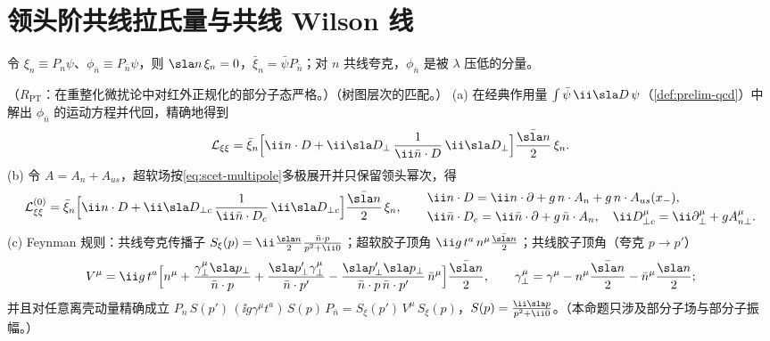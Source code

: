 \section{领头阶共线拉氏量与共线 Wilson 线}\label{sec:scet-lagrangian}

令 $\xi_n\equiv P_n\psi$、$\phi_{\bar n}\equiv P_{\bar n}\psi$，则 $\sla n\,\xi_n=0$，$\bar\xi_n=\bar\psi P_{\bar n}$；对 $n$ 共线夸克，$\phi_{\bar n}$ 是被 $\lambda$ 压低的分量。

\begin{proposition}\label{prop:scet-lagrangian}
（$R_{\mathrm{PT}}$：在重整化微扰论中对红外正规化的部分子态严格。）（树图层次的匹配。）
(a) 在经典作用量 $\int\bar\psi\,\ii\sla D\,\psi$（\cref{def:prelim-qcd}）中解出 $\phi_{\bar n}$ 的运动方程并代回，精确地得到
\begin{equation}\label{eq:scet-Lxixi-exact}
\mathcal L_{\xi\xi}=\bar\xi_n\Big[\ii n\cdot D+\ii\sla D_\perp\,\frac{1}{\ii\bar n\cdot D}\,\ii\sla D_\perp\Big]\frac{\bar{\sla n}}{2}\,\xi_n .
\end{equation}
(b) 令 $A=A_n+A_{us}$，超软场按\cref{eq:scet-multipole}多极展开并只保留领头幂次，得
\begin{equation}\label{eq:scet-L0xi}
\mathcal L^{(0)}_{\xi\xi}=\bar\xi_n\Big[\ii n\cdot D+\ii\sla D_{\perp c}\,\frac{1}{\ii\bar n\cdot D_c}\,\ii\sla D_{\perp c}\Big]\frac{\bar{\sla n}}{2}\,\xi_n,\qquad
\begin{aligned}
&\ii n\cdot D=\ii n\cdot\partial+g\,n\cdot A_n+g\,n\cdot A_{us}(x_-),\\
&\ii\bar n\cdot D_c=\ii\bar n\cdot\partial+g\,\bar n\cdot A_n,\quad \ii D^\mu_{\perp c}=\ii\partial^\mu_\perp+gA^\mu_{n\perp}.
\end{aligned}
\end{equation}
(c) Feynman 规则：共线夸克传播子 $S_\xi(p)=\ii\frac{\sla n}{2}\frac{\bar n\cdot p}{p^2+\ii0}$；超软胶子顶角 $\ii g\,t^a\,n^\mu\frac{\bar{\sla n}}{2}$；共线胶子顶角（夸克 $p\to p'$）
\begin{equation}\label{eq:scet-collvertex}
V^\mu=\ii g\,t^a\Big[n^\mu+\frac{\gamma_\perp^\mu\sla p_\perp}{\bar n\cdot p}+\frac{\sla p'_\perp\gamma_\perp^\mu}{\bar n\cdot p'}-\frac{\sla p'_\perp\sla p_\perp}{\bar n\cdot p\,\bar n\cdot p'}\,\bar n^\mu\Big]\frac{\bar{\sla n}}{2},\qquad
\gamma_\perp^\mu=\gamma^\mu-n^\mu\frac{\bar{\sla n}}{2}-\bar n^\mu\frac{\sla n}{2};
\end{equation}
并且对任意离壳动量精确成立 $P_n\,S(p')\,(\ii g\gamma^\mu t^a)\,S(p)\,P_{\bar n}=S_\xi(p')\,V^\mu\,S_\xi(p)$，$S(p)=\frac{\ii\sla p}{p^2+\ii0}$。（本命题只涉及部分子场与部分子振幅。）
\end{proposition}

